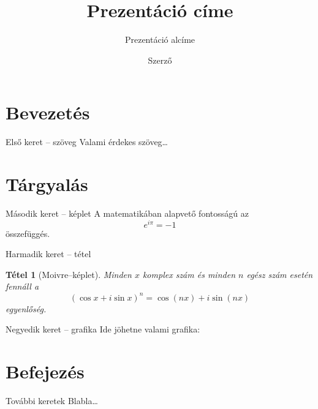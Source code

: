\documentclass[mathserif]{beamer}
\title{Prezentáció címe}
\subtitle{Prezentáció alcíme}
\author{Szerző}
\institute[SZTE]{Szegedi Tudományegyetem}
\newtheorem{tet}{Tétel}
\begin{document}
%
\begin{frame}[plain] %
  \maketitle
\end{frame}
%
\begin{frame}
\tableofcontents
\end{frame}
%
\section{Bevezetés}
%	
\begin{frame}{Első keret -- szöveg}
  Valami érdekes szöveg\dots
\end{frame}
%
\section{Tárgyalás}
%
\begin{frame}{Második keret -- képlet}
A matematikában alapvető fontosságú az
\begin{equation}
	e^{i\pi} = -1 \tag{Euler--egyenlet}
\end{equation}
összefüggés.
\end{frame}
%
\begin{frame}{Harmadik keret -- tétel}
\begin{tet}[Moivre--képlet]
Minden $x$ komplex szám és  minden $n$ egész szám esetén fennáll a
\[ 
\left(\cos x+i\sin x\right)^{n}=\cos \left(nx\right)+i\sin \left(nx\right)
\]	
egyenlőség. 
\end{tet}
\end{frame}
%
\begin{frame}{Negyedik keret -- grafika}
Ide jöhetne valami grafika:

\begin{center}
\end{center}
\end{frame}
%
\section{Befejezés}
%
\begin{frame}{További keretek}
	Blabla\dots
\end{frame}
\end{document}
